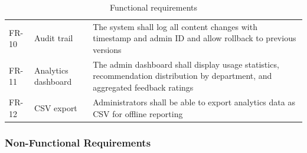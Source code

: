 ﻿\documentclass[12pt, a4paper]{article}
\newcommand{\rowalt}{\rowcolor{tablerowalt}}
\begin{document}
\begin{table}[H]
\begin{tabularx}{\textwidth}{p{1.2cm}p{3.5cm}X}
\rowalt
FR-10 & Audit trail & The system shall log all content changes with timestamp and admin ID and allow rollback to previous versions \\[4pt]
FR-11 & Analytics dashboard & The admin dashboard shall display usage statistics, recommendation distribution by department, and aggregated feedback ratings \\[4pt]
\rowalt
FR-12 & CSV export & Administrators shall be able to export analytics data as CSV for offline reporting \\
\bottomrule
\end{tabularx}
\caption{Functional requirements}
\end{table}

\subsubsection*{Non-Functional Requirements}
\end{document}
